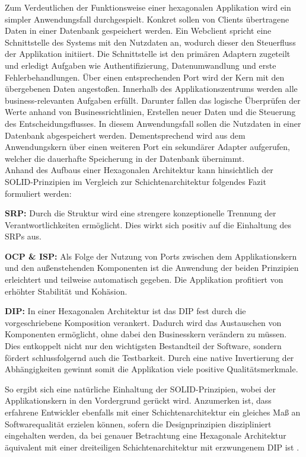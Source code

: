 Zum Verdeutlichen der Funktionsweise einer hexagonalen Applikation wird ein simpler Anwendungsfall durchgespielt. Konkret sollen von Clients übertragene Daten in einer Datenbank gespeichert werden. Ein Webclient spricht eine Schnittstelle des Systems mit den Nutzdaten an, wodurch dieser den Steuerfluss der Applikation initiiert. Die Schnittstelle ist den primären Adaptern zugeteilt und erledigt Aufgaben wie Authentifizierung, Datenumwandlung und erste Fehlerbehandlungen. Über einen entsprechenden Port wird der Kern mit den übergebenen Daten angestoßen. Innerhalb des Applikationszentrums werden alle business-relevanten Aufgaben erfüllt. Darunter fallen das logische Überprüfen der Werte anhand von Businessrichtlinien, Erstellen neuer Daten und die Steuerung des Entscheidungsflusses. In diesem Anwendungsfall sollen die Nutzdaten in einer Datenbank abgespeichert werden. Dementsprechend wird aus dem Anwendungskern über einen weiteren Port ein sekundärer Adapter aufgerufen, welcher die dauerhafte Speicherung in der Datenbank übernimmt.  \\

Anhand des Aufbaus einer Hexagonalen Architektur kann hinsichtlich der SOLID-Prinzipien im Vergleich zur Schichtenarchitektur folgendes Fazit formuliert werden:

\textbf{\acrlong{SRP}: } {Durch die Struktur wird eine strengere konzeptionelle Trennung der Verantwortlichkeiten ermöglicht. Dies wirkt sich positiv auf die Einhaltung des \acrlong{SRP}s aus.}

\textbf{\acrlong{OCP} \& \acrlong{ISP}: } {Als Folge der Nutzung von Ports zwischen dem Applikationskern und den außenstehenden Komponenten ist die Anwendung der beiden Prinzipien erleichtert und teilweise automatisch gegeben. Die Applikation profitiert von erhöhter Stabilität und Kohäsion. }

\textbf{\acrlong{DIP}: } {In einer Hexagonalen Architektur ist das \acrlong{DIP} fest durch die vorgeschriebene Komposition verankert. Dadurch wird das Austauschen von Komponenten ermöglicht, ohne dabei den Businesskern verändern zu müssen. Dies entkoppelt nicht nur den wichtigsten Bestandteil der Software, sondern fördert schlussfolgernd auch die Testbarkeit. Durch eine native Invertierung der Abhängigkeiten gewinnt somit die Applikation viele positive Qualitätsmerkmale. \cite{Alliaume.2018, Martinez.2021}}

So ergibt sich eine natürliche Einhaltung der SOLID-Prinzipien, wobei der Applikationskern in den Vordergrund gerückt wird. Anzumerken ist, dass erfahrene Entwickler ebenfalls mit einer Schichtenarchitektur ein gleiches Maß an Softwarequalität erzielen können, sofern die Designprinzipien diszipliniert eingehalten werden, da bei genauer Betrachtung eine Hexagonale Architektur äquivalent mit einer dreiteiligen Schichtenarchitektur mit erzwungenem \acrlong{DIP} ist \cite{Seemann.2013} \cite[S. 125ff.]{Vernon.2015}. 


